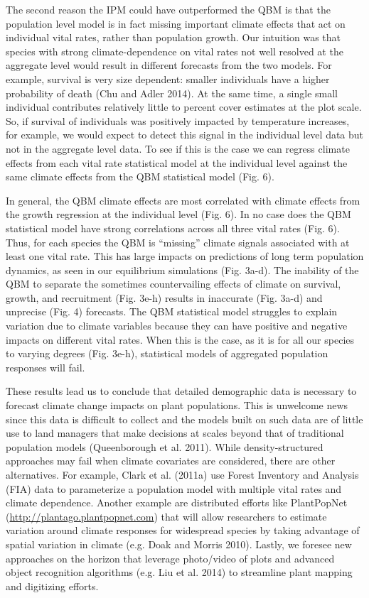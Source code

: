 \documentclass[12pt,]{article}
\begin{document}
The second reason the IPM could have outperformed the QBM is that the
population level model is in fact missing important climate effects that
act on individual vital rates, rather than population growth. Our
intuition was that species with strong climate-dependence on vital rates
not well resolved at the aggregate level would result in different
forecasts from the two models. For example, survival is very size
dependent: smaller individuals have a higher probability of death (Chu
and Adler 2014). At the same time, a single small individual contributes
relatively little to percent cover estimates at the plot scale. So, if
survival of individuals was positively impacted by temperature
increases, for example, we would expect to detect this signal in the
individual level data but not in the aggregate level data. To see if
this is the case we can regress climate effects from each vital rate
statistical model at the individual level against the same climate
effects from the QBM statistical model (Fig. 6).

In general, the QBM climate effects are most correlated with climate
effects from the growth regression at the individual level (Fig. 6). In
no case does the QBM statistical model have strong correlations across
all three vital rates (Fig. 6). Thus, for each species the QBM is
``missing'' climate signals associated with at least one vital rate.
This has large impacts on predictions of long term population dynamics,
as seen in our equilibrium simulations (Fig. 3a-d). The inability of the
QBM to separate the sometimes countervailing effects of climate on
survival, growth, and recruitment (Fig. 3e-h) results in inaccurate
(Fig. 3a-d) and unprecise (Fig. 4) forecasts. The QBM statistical model
struggles to explain variation due to climate variables because they can
have positive and negative impacts on different vital rates. When this
is the case, as it is for all our species to varying degrees (Fig.
3e-h), statistical models of aggregated population responses will fail.

These results lead us to conclude that detailed demographic data is
necessary to forecast climate change impacts on plant populations. This
is unwelcome news since this data is difficult to collect and the models
built on such data are of little use to land managers that make
decisions at scales beyond that of traditional population models
(Queenborough et al. 2011). While density-structured approaches may fail
when climate covariates are considered, there are other alternatives.
For example, Clark et al. (2011a) use Forest Inventory and Analysis
(FIA) data to parameterize a population model with multiple vital rates
and climate dependence. Another example are distributed efforts like
PlantPopNet (\url{http://plantago.plantpopnet.com}) that will allow
researchers to estimate variation around climate responses for
widespread species by taking advantage of spatial variation in climate
(e.g. Doak and Morris 2010). Lastly, we foresee new approaches on the
horizon that leverage photo/video of plots and advanced object
recognition algorithms (e.g. Liu et al. 2014) to streamline plant
mapping and digitizing efforts.
\end{document}
